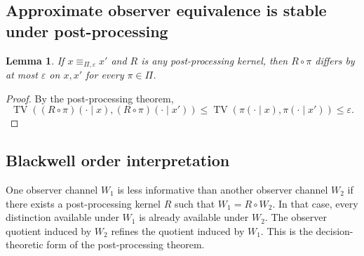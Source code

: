 \documentclass[11pt]{article}
\theoremstyle{definition}
\theoremstyle{plain}
\newtheorem{lemma}[definition]{Lemma}
\theoremstyle{remark}
\DeclareMathOperator{\TV}{TV}
\newcommand{\eps}{\varepsilon}
\newcommand{\eqep}{\equiv_{\Pi,\eps}}
\begin{document}
\subsection{Approximate observer equivalence is stable under post-processing}

\begin{lemma}
If $x\eqep x'$ and $R$ is any post-processing kernel, then $R\circ\pi$ differs by at most $\eps$ on $x,x'$ for every $\pi\in\Pi$.
\end{lemma}

\begin{proof}
By the post-processing theorem,
\[
\TV((R\circ\pi)(\cdot\mid x),(R\circ\pi)(\cdot\mid x'))\le\TV(\pi(\cdot\mid x),\pi(\cdot\mid x'))\le\eps.
\]
\end{proof}

\subsection{Blackwell order interpretation}

One observer channel $W_1$ is less informative than another observer channel $W_2$ if there exists a post-processing kernel $R$ such that $W_1=R\circ W_2$. In that case, every distinction available under $W_1$ is already available under $W_2$. The observer quotient induced by $W_2$ refines the quotient induced by $W_1$. This is the decision-theoretic form of the post-processing theorem.
\end{document}
